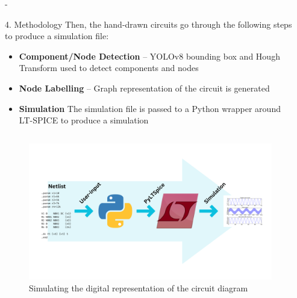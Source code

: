 \documentclass{beamer}
\begin{document}
\begin{frame}[t]
\begin{columns}[t]
\begin{column}{\colwidth}
{\begin{alertblock}{}
\begin{column}{\colwidth-\sepwidth}
{\begin{block}{4. Methodology}
                \RaggedRight
                Then, the hand-drawn circuits go through the following steps to produce a simulation file:
                \begin{itemize}
                  \RaggedRight
                  \item \textbf{Component/Node Detection} -- YOLOv8 bounding box and Hough Transform used to detect components and nodes
                  \item \textbf{Node Labelling} -- Graph representation of the circuit is generated
                  \item \textbf{Simulation} The simulation file is passed to a Python wrapper around LT-SPICE
                        to produce a simulation
                \end{itemize}
              \end{block}
            }
          \end{column}
        \end{alertblock}
      }
      {\beamerblocknoheader
        \begin{block}{}
          \begin{figure}[t]
            \centering
            \includegraphics[width=\colwidth,height=40ex]{../common/graphics/create-simulation}
            \caption{Simulating the digital representation of the circuit diagram}
            \label{key3}
          \end{figure}
        \end{block}
      }
    \end{column}

    \separatorcolumn

    \begin{column}{\colwidth}


\end{column}
\end{columns}
\end{frame}
\end{document}
